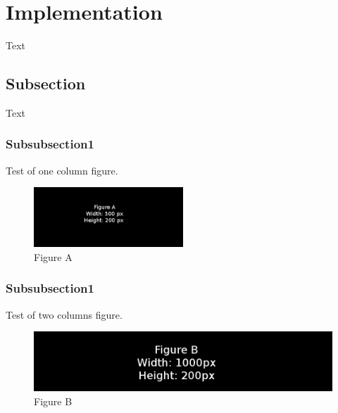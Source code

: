 \section{Implementation}\label{sec:implementation}
Text

\subsection{Subsection}
Text
\subsubsection{Subsubsection1}
Test of one column figure.
\begin{figure}[h]
    \includegraphics[width=0.5\textwidth]{./figure/figureA.png}
    \caption{Figure A}
\end{figure}

\subsubsection{Subsubsection1}
Test of two columns figure.
\begin{figure}[t]
    \includegraphics[width=1.0\textwidth]{./figure/figureB.png}
    \caption{Figure B}
\end{figure}
